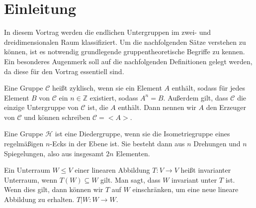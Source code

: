 \section{Einleitung}
In diesem Vortrag werden die endlichen Untergruppen im zwei- und dreidimensionalen Raum klassifiziert. Um die nachfolgenden Sätze verstehen zu können, ist es notwendig grundlegende gruppentheoretische Begriffe zu kennen. Ein besonderes Augenmerk soll auf die nachfolgenden Definitionen gelegt werden, da diese für den Vortrag essentiell sind.
\begin{defi}
 Eine Gruppe $\mathcal{C}$ heißt zyklisch, wenn sie ein Element $A$ enthält, sodass für jedes Element $B$ von $\mathcal{C}$ ein $n \in \mathbb{Z}$ existiert, sodass $A^n = B$. Außerdem gilt, dass $\mathcal{C}$ die einzige Untergruppe von $\mathcal{C}$ ist, die $A$ enthält. Dann nennen wir $A$ den Erzeuger von $\mathcal{C}$ und können schreiben $\mathcal{C} = <A>$.
\end{defi}
\begin{defi}[Diedergruppe]
 Eine Gruppe $\mathcal{H}$ ist eine Diedergruppe, wenn sie die Isometriegruppe eines regelmäßigen $n$-Ecks in der Ebene ist. Sie besteht dann aus $n$ Drehungen und $n$ Spiegelungen, also aus insgesamt $2n$ Elementen.
\end{defi}
\begin{defi}
 Ein Unterraum $W \leq V$ einer linearen Abbildung $T:V \rightarrow V$ heißt invarianter Unterraum, wenn $T(W) \subseteq W$ gilt. Man sagt, dass $W$ invariant unter $T$ ist. Wenn dies gilt, dann können wir $T$ auf $W$ einschränken, um eine neue lineare Abbildung zu erhalten. $T|W:W\rightarrow W$.
\end{defi}

